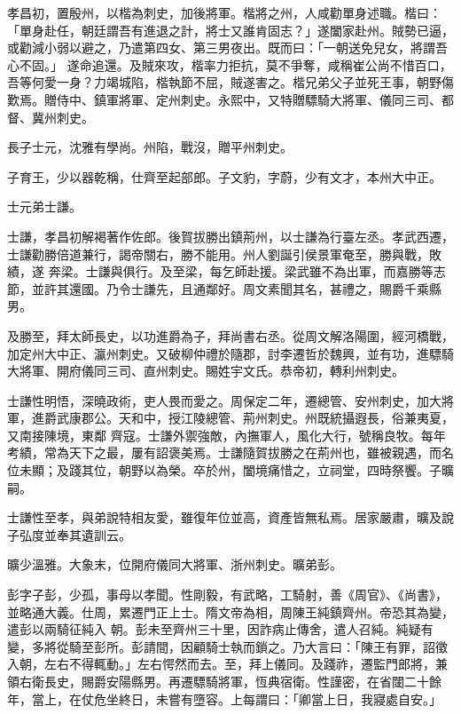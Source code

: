 \begin{pinyinscope}
 孝昌初，置殷州，以楷為刺史，加後將軍。楷將之州，人咸勸單身述職。楷曰：「單身赴任，朝廷謂吾有進退之計，將士又誰肯固志？」遂闔家赴州。賊勢已逼，或勸減小弱以避之，乃遣第四女、第三男夜出。既而曰：「一朝送免兒女，將謂吾心不固。」
 遂命追還。及賊來攻，楷率力拒抗，莫不爭奪，咸稱崔公尚不惜百口，吾等何愛一身？力竭城陷，楷執節不屈，賊遂害之。楷兄弟父子並死王事，朝野傷歎焉。贈侍中、鎮軍將軍、定州刺史。永熙中，又特贈驃騎大將軍、儀同三司、都督、冀州刺史。



 長子士元，沈雅有學尚。州陷，戰沒，贈平州刺史。



 子育王，少以器乾稱，仕齊至起部郎。子文豹，字蔚，少有文才，本州大中正。



 士元弟士謙。



 士謙，孝昌初解褐著作佐郎。後賀拔勝出鎮荊州，以士謙為行臺左丞。孝武西遷，士謙勸勝倍道兼行，謁帝關右，勝不能用。州人劉誕引侯景軍奄至，勝與戰，敗績，遂
 奔梁。士謙與俱行。及至梁，每乞師赴援。梁武雖不為出軍，而嘉勝等志節，並許其還國。乃令士謙先，且通鄰好。周文素聞其名，甚禮之，賜爵千乘縣男。



 及勝至，拜太師長史，以功進爵為子，拜尚書右丞。從周文解洛陽圍，經河橋戰，加定州大中正、瀛州刺史。又破柳仲禮於隨郡，討李遷哲於魏興，並有功，進驃騎大將軍、開府儀同三司、直州刺史。賜姓宇文氏。恭帝初，轉利州刺史。



 士謙性明悟，深曉政術，吏人畏而愛之。周保定二年，遷總管、安州刺史，加大將軍，進爵武康郡公。天和中，授江陵總管、荊州刺史。州既統攝遐長，俗兼夷夏，又南接陳境，東鄰
 齊寇。士謙外禦強敵，內撫軍人，風化大行，號稱良牧。每年考績，常為天下之最，屢有詔褒美焉。士謙隨賀拔勝之在荊州也，雖被親遇，而名位未顯；及踐其位，朝野以為榮。卒於州，闔境痛惜之，立祠堂，四時祭饗。子曠嗣。



 士謙性至孝，與弟說特相友愛，雖復年位並高，資產皆無私焉。居家嚴肅，曠及說子弘度並奉其遺訓云。



 曠少溫雅。大象末，位開府儀同大將軍、浙州刺史。曠弟彭。



 彭字子彭，少孤，事母以孝聞。性剛毅，有武略，工騎射，善《周官》、《尚書》，並略通大義。仕周，累遷門正上士。隋文帝為相，周陳王純鎮齊州。帝恐其為變，遣彭以兩騎征純入
 朝。彭未至齊州三十里，因詐病止傳舍，遣人召純。純疑有變，多將從騎至彭所。彭請間，因顧騎士執而鎖之。乃大言曰：「陳王有罪，詔徵入朝，左右不得輒動。」左右愕然而去。至，拜上儀同。及踐祚，遷監門郎將，兼領右衛長史，賜爵安陽縣男。再遷驃騎將軍，恆典宿衛。性謹密，在省闥二十餘年，當上，在仗危坐終日，未嘗有墮容。上每謂曰：「卿當上日，我寢處自安。」




\end{pinyinscope}
